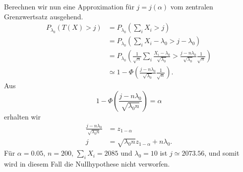 Berechnen wir nun eine Approximation für $j=j(\alpha)$ vom zentralen Grenzwertsatz ausgehend.
\begin{align*}
    P_{\lambda_0} \left( T(X) > j \right) &= P_{\lambda_0} \left( \sum_{i}^{} X_i > j \right) \\
    &= P_{\lambda_0} \left( \sum_{i}^{} X_i -\lambda_0 > j - \lambda_0 \right) \\
    &= P_{\lambda_0} \left( \frac{1}{\sqrt{n}} \sum_{i}^{} \frac{ X_i - \lambda_0}{ \sqrt{\lambda_0}} > \frac{j-n\lambda_0}{\sqrt{\lambda_0}}\frac{1}{\sqrt{n}} \right) \\
    &\simeq 1-\Phi \left( \frac{j-n\lambda_0}{\sqrt{\lambda_0}}\frac{1}{\sqrt{n}}  \right). 
\end{align*}
Aus
\begin{equation*}
    1-\Phi \left( \frac{j-n\lambda_0}{\sqrt{\lambda_0 n}} \right) = \alpha
\end{equation*}
erhalten wir
\begin{align*}
    \frac{j-n\lambda_0}{\sqrt{\lambda_0 n}} &=  z_{1-\alpha} \\
    j &=  \sqrt{\lambda_0 n} z_{1-\alpha} + n\lambda_0.
\end{align*}
Für $\alpha=0.05$, $n=200$, $\sum_{i}^{}X_i=2085$ und $\lambda_0=10$ ist $j\simeq 2073.56$,
und somit wird in diesem Fall die Nullhypothese nicht verworfen.









